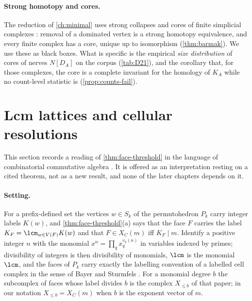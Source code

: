 \paragraph{Strong homotopy and cores.} The reduction of \cref{ch:minimal} uses strong collapses and cores of finite simplicial complexes \cite{BarmakMinian}: removal of a dominated vertex is a strong homotopy equivalence, and every finite complex has a core, unique up to isomorphism (\cref{thm:barmak}). We use these as black boxes. What is specific is the empirical \emph{size distribution} of cores of nerves $N[D_A]$ on the corpus (\cref{tab:D21}), and the corollary that, for those complexes, the core is a complete invariant for the homology of $K_A$ while no count-level statistic is (\cref{prop:counts-fail}).

\section{Lcm lattices and cellular resolutions}\label{sec:lcm}
This section records a reading of \cref{thm:face-threshold} in the language of combinatorial commutative algebra \cite{MillerSturmfels}. It is offered as an interpretation resting on a cited theorem, not as a new result, and none of the later chapters depends on it.

\paragraph{Setting.} For a prefix-defined set the vertices $w\in S_k$ of the permutohedron $P_k$ carry integer labels $K(w)$, and \cref{thm:face-threshold}(a) says that the face $F$ carries the label $K_F=\lcm_{w\in V(F)}K(w)$ and that $F\in X_C(m)$ iff $K_F\mid m$. Identify a positive integer $n$ with the monomial $x^{n}=\prod_q x_q^{v_q(n)}$ in variables indexed by primes; divisibility of integers is then divisibility of monomials, $\lcm$ is the monomial $\lcm$, and the faces of $P_k$ carry exactly the labelling convention of a labelled cell complex in the sense of Bayer and Sturmfels \cite{BayerSturmfels}. For a monomial degree $b$ the subcomplex of faces whose label divides $b$ is the complex $X_{\le b}$ of that paper; in our notation $X_{\le b}=X_C(m)$ when $b$ is the exponent vector of $m$.

